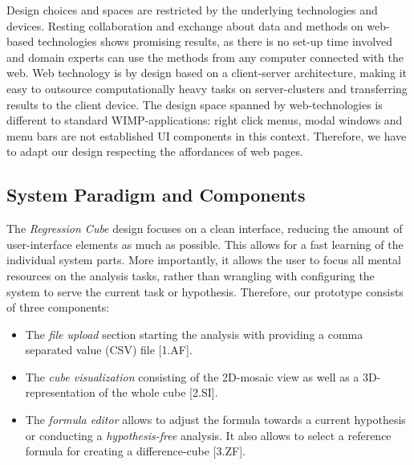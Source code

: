 \documentclass[journal]{style/vgtc} 			          %
\newcommand{\com}[1]{\textcolor{orange}{\uline{#1}}}
\begin{document}
\noindent Design choices and spaces are restricted by the underlying technologies and devices.
Resting collaboration and exchange about data and methods on web-based technologies shows promising results, as there is no set-up time involved and domain experts can use the methods from any computer connected with the web.
Web technology is by design based on a client-server architecture, making it easy to outsource computationally heavy tasks on server-clusters and transferring results to the client device.
The design space spanned by web-technologies is different to standard WIMP-applications: right click menus, modal windows and menu bars are not established UI components in this context.
Therefore, we have to adapt our design respecting the affordances of web pages.
\subsection{System Paradigm and Components}
The \emph{Regression Cube} design focuses on a clean interface, reducing the amount of user-interface elements as much as possible.
This allows for a fast learning of the individual system parts.
More importantly, it allows the user to focus all mental resources on the analysis tasks, rather than wrangling with configuring the system to serve the current task or hypothesis.
Therefore, our prototype consists of three components:
\begin{itemize}
	\item The \emph{file upload} section starting the analysis with providing a comma separated value (CSV) file [1.AF].
	\item The \emph{cube visualization} consisting of the 2D-mosaic view as well as a 3D-representation of the whole cube [2.SI].
	\item The \emph{formula editor} allows to adjust the formula towards a current hypothesis or conducting a \emph{hypothesis-free} analysis.
	It also allows to select a reference formula for creating a difference-cube [3.ZF].
\end{itemize}
\end{document}
